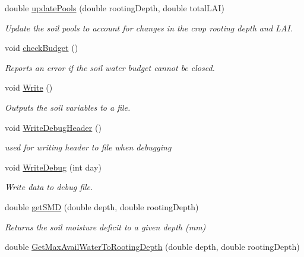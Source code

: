 \begin{DoxyCompactItemize}
double \mbox{\hyperlink{classsimplesoil_model_1_1simple_soil_a1cdf6eb12b0414d1fc6002a08f803f05}{update\+Pools}} (double rooting\+Depth, double total\+L\+AI)
\begin{DoxyCompactList}\small\item\em Update the soil pools to account for changes in the crop rooting depth and L\+AI. \end{DoxyCompactList}\item 
void \mbox{\hyperlink{classsimplesoil_model_1_1simple_soil_a40799ba66476c4a190adafc91169699f}{check\+Budget}} ()
\begin{DoxyCompactList}\small\item\em Reports an error if the soil water budget cannot be closed. \end{DoxyCompactList}\item 
void \mbox{\hyperlink{classsimplesoil_model_1_1simple_soil_a8e716d4ae99f278b1bf013e04e0de57c}{Write}} ()
\begin{DoxyCompactList}\small\item\em Outputs the soil variables to a file. \end{DoxyCompactList}\item 
void \mbox{\hyperlink{classsimplesoil_model_1_1simple_soil_a2c3168847b685c0972abc43cb71be993}{Write\+Debug\+Header}} ()
\begin{DoxyCompactList}\small\item\em used for writing header to file when debugging \end{DoxyCompactList}\item 
void \mbox{\hyperlink{classsimplesoil_model_1_1simple_soil_a082248ca3544715749dfa69649b1adee}{Write\+Debug}} (int day)
\begin{DoxyCompactList}\small\item\em Write data to debug file. \end{DoxyCompactList}\item 
double \mbox{\hyperlink{classsimplesoil_model_1_1simple_soil_a5ed67a8d25b44c463f586d3689296211}{get\+S\+MD}} (double depth, double rooting\+Depth)
\begin{DoxyCompactList}\small\item\em Returns the soil moisture deficit to a given depth (mm) \end{DoxyCompactList}\item 
double \mbox{\hyperlink{classsimplesoil_model_1_1simple_soil_a91b32d1ce3edeea34d86405ba9013c21}{Get\+Max\+Avail\+Water\+To\+Rooting\+Depth}} (double depth, double rooting\+Depth)

\end{DoxyCompactItemize}

